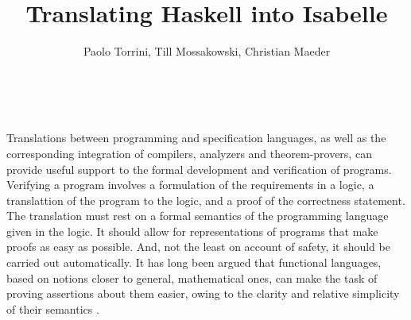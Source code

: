 \documentclass{llncs}
\begin{document}
\title{Translating Haskell into Isabelle}

\author{Paolo Torrini, Till Mossakowski, Christian Maeder} 

\date{}

\maketitle

\\

\sloppy

\noindent 
Translations between programming and specification languages, as well
as the corresponding integration of compilers, analyzers and
theorem-provers, can provide useful support to the formal development
and verification of programs.  Verifying a program involves a
formulation of the requirements in a logic, a translattion of the
program to the logic, and a proof of the correctness statement. The
translation must rest on a formal semantics of the programming
language given in the logic. It should allow for representations of
programs that make proofs as easy as possible. And, not the least on
account of safety, it should be carried out automatically. It has long
been argued that functional languages, based on notions closer to
general, mathematical ones, can make the task of proving assertions
about them easier, owing to the clarity and relative simplicity of
their semantics \cite{Thompson92}.
\end{document}
